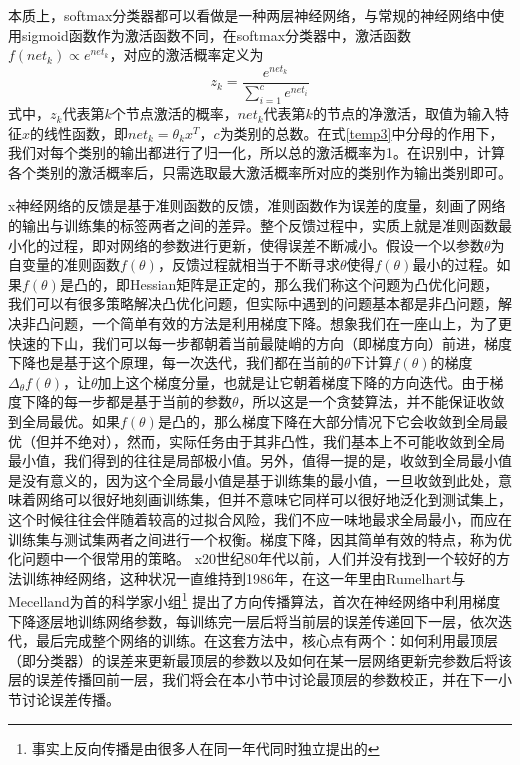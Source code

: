 本质上，softmax分类器都可以看做是一种两层神经网络，与常规的神经网络中使用sigmoid函数作为激活函数不同，在softmax分类器中，激活函数$f(net_k) \propto e^{net_k}$，对应的激活概率定义为
\begin{equation}\label{temp3}
z_k = \frac{e^{net_k}}{\sum_{i=1}^c e^{net_i}}
\end{equation}
式中，$z_k$代表第$k$个节点激活的概率，$net_k$代表第$k$的节点的净激活，取值为输入特征$x$的线性函数，即$net_k = \theta_k  x^T$，$c$为类别的总数。在式\eqref{temp3}中分母的作用下，我们对每个类别的输出都进行了归一化，所以总的激活概率为1。在识别中，计算各个类别的激活概率后，只需选取最大激活概率所对应的类别作为输出类别即可。

x神经网络的反馈是基于准则函数的反馈，准则函数作为误差的度量，刻画了网络的输出与训练集的标签两者之间的差异。整个反馈过程中，实质上就是准则函数最小化的过程，即对网络的参数进行更新，使得误差不断减小。假设一个以参数$\theta$为自变量的准则函数$f(\theta)$，反馈过程就相当于不断寻求$\theta$使得$f(\theta)$最小的过程。如果$f(\theta)$是凸的，即Hessian矩阵是正定的，那么我们称这个问题为凸优化问题，我们可以有很多策略解决凸优化问题，但实际中遇到的问题基本都是非凸问题，解决非凸问题，一个简单有效的方法是利用梯度下降。想象我们在一座山上，为了更快速的下山，我们可以每一步都朝着当前最陡峭的方向（即梯度方向）前进，梯度下降也是基于这个原理，每一次迭代，我们都在当前的$\theta$下计算$f(\theta)$的梯度$\Delta_\theta f(\theta)$，让$\theta$加上这个梯度分量，也就是让它朝着梯度下降的方向迭代。由于梯度下降的每一步都是基于当前的参数$\theta$，所以这是一个贪婪算法，并不能保证收敛到全局最优。如果$f(\theta)$是凸的，那么梯度下降在大部分情况下它会收敛到全局最优（但并不绝对），然而，实际任务由于其非凸性，我们基本上不可能收敛到全局最小值，我们得到的往往是局部极小值。另外，值得一提的是，收敛到全局最小值是没有意义的，因为这个全局最小值是基于训练集的最小值，一旦收敛到此处，意味着网络可以很好地刻画训练集，但并不意味它同样可以很好地泛化到测试集上，这个时候往往会伴随着较高的过拟合风险，我们不应一味地最求全局最小，而应在训练集与测试集两者之间进行一个权衡。梯度下降，因其简单有效的特点，称为优化问题中一个很常用的策略。
x20世纪80年代以前，人们并没有找到一个较好的方法训练神经网络，这种状况一直维持到1986年，在这一年里由Rumelhart与Mecelland为首的科学家小组\footnote{事实上反向传播是由很多人在同一年代同时独立提出的} 提出了方向传播算法，首次在神经网络中利用梯度下降逐层地训练网络参数，每训练完一层后将当前层的误差传递回下一层，依次迭代，最后完成整个网络的训练。在这套方法中，核心点有两个：如何利用最顶层（即分类器）的误差来更新最顶层的参数以及如何在某一层网络更新完参数后将该层的误差传播回前一层，我们将会在本小节中讨论最顶层的参数校正，并在下一小节讨论误差传播。
